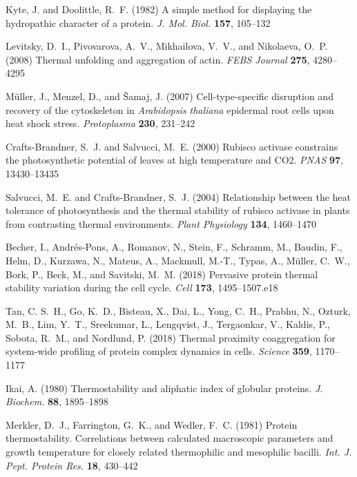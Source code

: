 \documentclass[11pt,letter]{article}\usepackage[]{graphicx}\usepackage[]{color}
\begin{document}
\begin{thebibliography}{}
Kyte, J. and Doolittle, R.~F. (1982) A simple method for displaying the
  hydropathic character of a protein. {\emph{J. Mol. Biol.}} {\bf 157},
  105--132

Levitsky, D.~I., Pivovarova, A.~V., Mikhailova, V.~V., and Nikolaeva, O.~P.
  (2008) Thermal unfolding and aggregation of actin. {\emph{FEBS Journal}} {\bf
  275}, 4280--4295

Müller, J., Menzel, D., and Šamaj, J. (2007) Cell-type-specific disruption
  and recovery of the cytoskeleton in \textit{{Arabidopsis} thaliana} epidermal
  root cells upon heat shock stress. {\emph{Protoplasma}} {\bf 230}, 231--242

Crafts-Brandner, S.~J. and Salvucci, M.~E. (2000) Rubisco activase constrains
  the photosynthetic potential of leaves at high temperature and {CO}2.
  {\emph{PNAS}} {\bf 97}, 13430--13435

Salvucci, M.~E. and Crafts-Brandner, S.~J. (2004) Relationship between the heat
  tolerance of photosynthesis and the thermal stability of rubisco activase in
  plants from contrasting thermal environments. {\emph{Plant Physiology}} {\bf
  134}, 1460--1470

Becher, I., Andrés-Pons, A., Romanov, N., Stein, F., Schramm, M., Baudin, F.,
  Helm, D., Kurzawa, N., Mateus, A., Mackmull, M.-T., Typas, A., Müller,
  C.~W., Bork, P., Beck, M., and Savitski, M.~M. (2018) Pervasive protein
  thermal stability variation during the cell cycle. {\emph{Cell}} {\bf 173},
  1495--1507.e18

Tan, C. S.~H., Go, K.~D., Bisteau, X., Dai, L., Yong, C.~H., Prabhu, N.,
  Ozturk, M.~B., Lim, Y.~T., Sreekumar, L., Lengqvist, J., Tergaonkar, V.,
  Kaldis, P., Sobota, R.~M., and Nordlund, P. (2018) Thermal proximity
  coaggregation for system-wide profiling of protein complex dynamics in cells.
  {\emph{Science}} {\bf 359}, 1170--1177

Ikai, A. (1980) Thermostability and aliphatic index of globular proteins.
  {\emph{J. Biochem.}} {\bf 88}, 1895--1898

Merkler, D.~J., Farrington, G.~K., and Wedler, F.~C. (1981) Protein
  thermostability. {Correlations} between calculated macroscopic parameters and
  growth temperature for closely related thermophilic and mesophilic bacilli.
  {\emph{Int. J. Pept. Protein Res.}} {\bf 18}, 430--442


\end{thebibliography}
\end{document}
